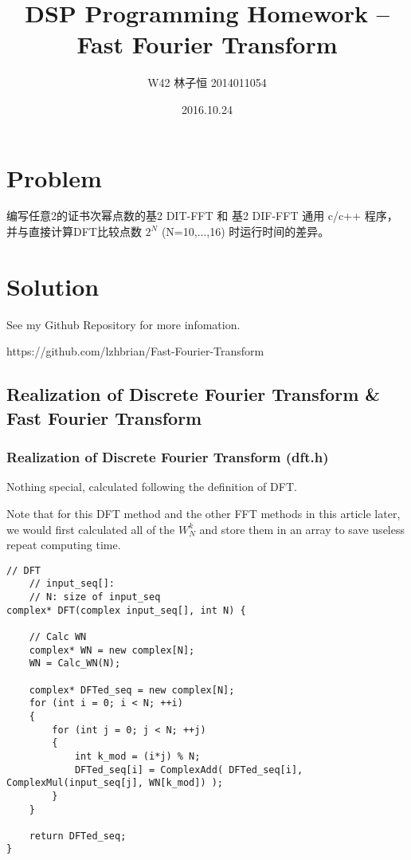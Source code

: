 \documentclass[UTF8,a4paper]{ctexart}
\author{W42 林子恒 2014011054}
\title{DSP Programming Homework -- Fast Fourier Transform}
\date{2016.10.24}
\begin{document}
  \maketitle
  \thispagestyle{empty}

\tableofcontents

\newpage


\section{Problem}

编写任意2的证书次幂点数的基2 DIT-FFT 和 基2 DIF-FFT 通用 c/c++ 程序，并与直接计算DFT比较点数 $2^{N}$ (N=10,...,16) 时运行时间的差异。


\section{Solution}

	See my Github Repository for more infomation.
	
	https://github.com/lzhbrian/Fast-Fourier-Transform
	

\subsection{Realization of Discrete Fourier Transform \& Fast Fourier Transform}

\subsubsection{Realization of Discrete Fourier Transform (dft.h)}

Nothing special, calculated following the definition of DFT.

Note that for this DFT method and the other FFT methods in this article later, we would first calculated all of the $W^{k}_{N}$ and store them in an array to save useless repeat computing time.

    \begin{lstlisting}
// DFT
	// input_seq[]: 
	// N: size of input_seq
complex* DFT(complex input_seq[], int N) {

	// Calc WN
	complex* WN = new complex[N];
	WN = Calc_WN(N);

	complex* DFTed_seq = new complex[N];
	for (int i = 0; i < N; ++i)
	{
		for (int j = 0; j < N; ++j)
		{
			int k_mod = (i*j) % N;
			DFTed_seq[i] = ComplexAdd( DFTed_seq[i], ComplexMul(input_seq[j], WN[k_mod]) );
		}
	}

	return DFTed_seq;
}
    \end{lstlisting}
\end{document}
